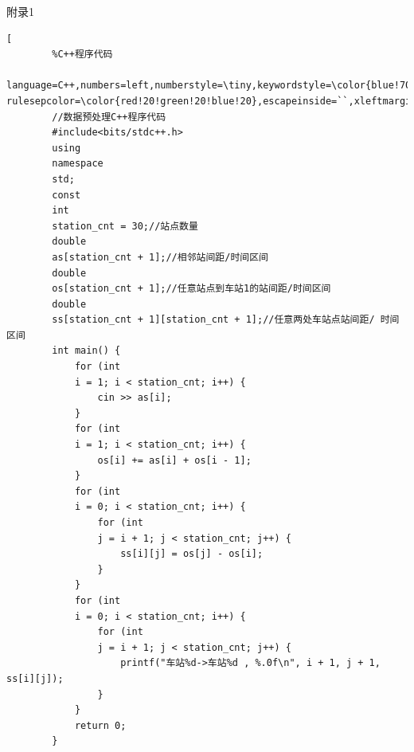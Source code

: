 \documentclass[UTF8]{ctexart}
\begin{document}
\begin{center}
	\sihao \heiti 附录1
	\fontsize{10pt}{16pt}		\selectfont	
	\begin{lstlisting}[ 
		%C++程序代码
		language=C++,numbers=left,numberstyle=\tiny,keywordstyle=\color{blue!70},commentstyle=\color{red!50!green!50!blue!50},frame=shadowbox, rulesepcolor=\color{red!20!green!20!blue!20},escapeinside=``,xleftmargin=2em,xrightmargin=2em,aboveskip=1em] 
		//数据预处理C++程序代码
		#include<bits/stdc++.h>
		using
		namespace
		std;
		const
		int
		station_cnt = 30;//站点数量
		double
		as[station_cnt + 1];//相邻站间距/时间区间
		double
		os[station_cnt + 1];//任意站点到车站1的站间距/时间区间
		double
		ss[station_cnt + 1][station_cnt + 1];//任意两处车站点站间距/ 时间区间
		int main() {
			for (int
			i = 1; i < station_cnt; i++) {
				cin >> as[i];
			}
			for (int
			i = 1; i < station_cnt; i++) {
				os[i] += as[i] + os[i - 1];
			}
			for (int
			i = 0; i < station_cnt; i++) {
				for (int
				j = i + 1; j < station_cnt; j++) {
					ss[i][j] = os[j] - os[i];
				}
			}
			for (int
			i = 0; i < station_cnt; i++) {
				for (int
				j = i + 1; j < station_cnt; j++) {
					printf("车站%d->车站%d , %.0f\n", i + 1, j + 1, ss[i][j]);
				}
			}
			return 0;
		}
		
	\end{lstlisting}
\end{center}
\end{document}
